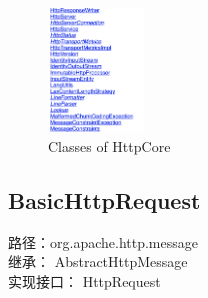 \documentclass{article}
\begin{document}
\begin{figure}[htbp]
{\begin{minipage}[t]{0.45\linewidth}
				\centering
				\includegraphics[width = 1in]{pics/19_all_classes.png}
			\end{minipage}
		}%
		\quad
		\centering
		\caption{Classes of HttpCore}
	\end{figure}

	\clearpage

	\subsection{BasicHttpRequest}
	\begin{CJK}{UTF8}{gbsn}
		路径：org.apache.http.message\\
		继承： AbstractHttpMessage\\
		实现接口： HttpRequest
	\end{CJK}{}
\end{document}

